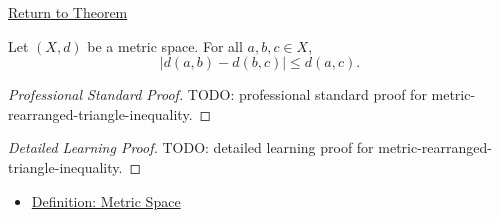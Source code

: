\newpage
{}
\label{prf:metric-rearranged-triangle-inequality}

\begin{remark*}[Return]
\hyperref[thm:metric-rearranged-triangle-inequality]{Return to Theorem}
\end{remark*}

\begin{theorem*}
Let \((X,d)\) be a metric space.  For all \(a,b,c\in X\),
\[
  \bigl|d(a,b)-d(b,c)\bigr|
  \leq
  d(a,c).
\]
\end{theorem*}

\begin{proof}[Professional Standard Proof]
\LRAProofBodyStart
TODO: professional standard proof for metric-rearranged-triangle-inequality.
\end{proof}

\begin{proof}[Detailed Learning Proof]
\LRAProofBodyStart
TODO: detailed learning proof for metric-rearranged-triangle-inequality.
\end{proof}

\begin{remark*}
\end{remark*}

\begin{dependencies}
\begin{itemize}
  \item \hyperref[def:metric-space]{Definition: Metric Space}
\end{itemize}
\end{dependencies}

\clearpage

